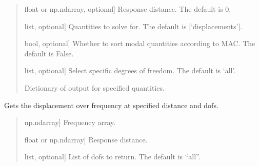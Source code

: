 \documentclass[letterpaper,10pt,english]{sphinxmanual}
\begin{document}
\begin{fulllineitems}
\begin{fulllineitems}
\begin{quote}
\begin{description}
\begin{description}
\sphinxlineitem{\sphinxstylestrong{x\_r}}{[}float or np.ndarray, optional{]}
\sphinxAtStartPar
Response distance. The default is 0.

\sphinxlineitem{\sphinxstylestrong{quantities}}{[}list, optional{]}
\sphinxAtStartPar
Quantities to solve for. The default is {[}‘displacements’{]}.

\sphinxlineitem{\sphinxstylestrong{mac}}{[}bool, optional{]}
\sphinxAtStartPar
Whether to sort modal quantities according to MAC. The default is False.

\sphinxlineitem{\sphinxstylestrong{dofs}}{[}list, optional{]}
\sphinxAtStartPar
Select specific degrees of freedom. The default is ‘all’.

\end{description}

\begin{description}
\sphinxAtStartPar
Dictionary of output for specified quantities.

\end{description}

\end{description}\end{quote}

\end{fulllineitems}


\begin{fulllineitems}
\label{\detokenize{model:pywfe.Model.transfer_function}}
\pysigstartsignatures
{}
\pysigstopsignatures
\sphinxAtStartPar
Gets the displacement over frequency at specified distance and dofs.
\begin{quote}\begin{description}
\begin{description}
\sphinxlineitem{\sphinxstylestrong{f\_arr}}{[}np.ndarray{]}
\sphinxAtStartPar
Frequency array.

\sphinxlineitem{\sphinxstylestrong{x\_r}}{[}float or np.ndarray{]}
\sphinxAtStartPar
Response distance.

\sphinxlineitem{\sphinxstylestrong{dofs}}{[}list, optional{]}
\sphinxAtStartPar
List of dofs to return. The default is “all”.


\end{description}
\end{description}
\end{quote}
\end{fulllineitems}
\end{fulllineitems}
\end{document}
